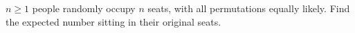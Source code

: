 $n\ge1$ people randomly occupy $n$ seats, with all permutations equally likely. Find the expected number sitting in their original seats.
